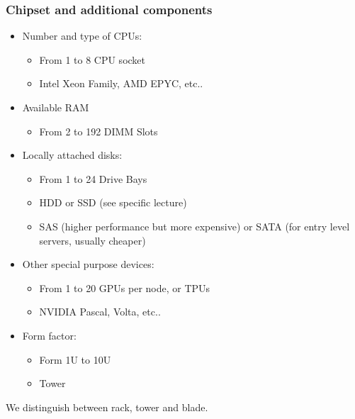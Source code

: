 \documentclass[10pt, oneside]{article}
\begin{document}
\subsubsection{Chipset and additional components}
\begin{itemize}
    \item Number and type of CPUs:
\begin{itemize}
    \item From 1 to 8 CPU socket
    \item Intel Xeon Family, AMD EPYC, etc..
\end{itemize}
    \item Available RAM
    \begin{itemize}
        \item From 2 to 192 DIMM Slots
    \end{itemize}
    \item Locally attached disks:
    \begin{itemize}
        \item From 1 to 24 Drive Bays
        \item HDD or SSD (see specific lecture)
        \item SAS (higher performance but more expensive) or SATA (for entry level servers, usually cheaper)
    \end{itemize}
    \item Other special purpose devices:
    \begin{itemize}
        \item From 1 to 20 GPUs per node, or TPUs
        \item NVIDIA Pascal, Volta, etc..
    \end{itemize}
    \item Form factor:
    \begin{itemize}
        \item Form 1U to 10U
        \item Tower
    \end{itemize}
\end{itemize}
We distinguish between rack, tower and blade.
\end{document}
